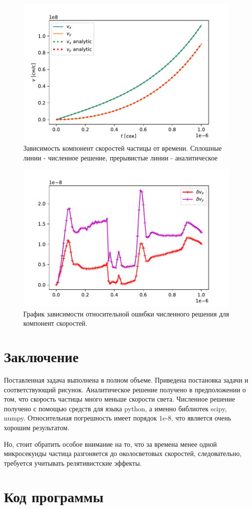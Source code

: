 \documentclass[a4paper]{article}
\begin{document}
\begin{figure}
	\centering
	\includegraphics[width=0.8\linewidth]{plotSpeed.pdf}
	\caption{Зависимость компонент скоростей частицы от времени. Сплошные линии - численное решение, прерывистые линии - аналитическое}
	\label{graph_s}
\end{figure}

\begin{figure}
	\centering
	\includegraphics[width=0.8\linewidth]{plotMistake.pdf}
	\caption{График зависимости относительной ошибки численного решения для компонент скоростей.}
	\label{graph_m}
\end{figure}

\section{Заключение}
Поставленная задача выполнена в полном объеме. Приведена постановка задачи и соответствующий рисунок. Аналитическое решение получено в предположении о том, что скорость частицы много меньше скорости света. Численное решение получено с помощью средств для языка python,  а именно библиотек scipy, numpy. Относительная погрешность имеет порядок  $1\text{e-}8$, что является очень хорошим результатом. 

Но, стоит обратить особое внимание на то, что за времена менее одной микросекунды частица разгоняется до околосветовых скоростей, следовательно, требуется учитывать релятивистские эффекты.

\clearpage
\section{Код программы}\label{code}

\end{document}
